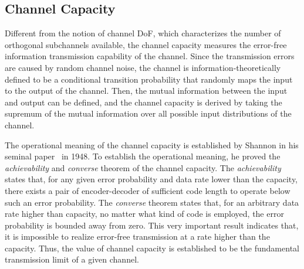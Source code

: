 \documentclass[journal,twocolumn]{IEEEtran}
\begin{document}
\vspace{-1em}
\subsection{Channel Capacity}
\label{Sec_2_Subsec_2}
Different from the notion of channel DoF, which characterizes the number of orthogonal subchannels available, the channel capacity measures the error-free information transmission capability of the channel. 
Since the transmission errors are caused by random channel noise, the channel is information-theoretically defined to be a conditional transition probability that randomly maps the input to the output of the channel. 
Then, the mutual information between the input and output can be defined, and the channel capacity is derived by taking the supremum of the mutual information over all possible input distributions of the channel. 

The operational meaning of the channel capacity is established by Shannon in his seminal paper~\cite{shannon1948mathematical} in 1948. To establish the operational meaning, he proved the {\it achievability} and {\it converse} theorem of the channel capacity. The {\it achievability} states that, for any given error probability and data rate lower than the capacity, there exists a pair of encoder-decoder of sufficient code length to operate below such an error probability. 
The {\it converse} theorem states that, for an arbitrary data rate higher than capacity, no matter what kind of code is employed, the error probability is bounded away from zero. This very important result indicates that, it is impossible to realize error-free transmission at a rate higher than the capacity. Thus, the value of channel capacity is established to be the fundamental transmission limit of a given channel. 
\end{document}
